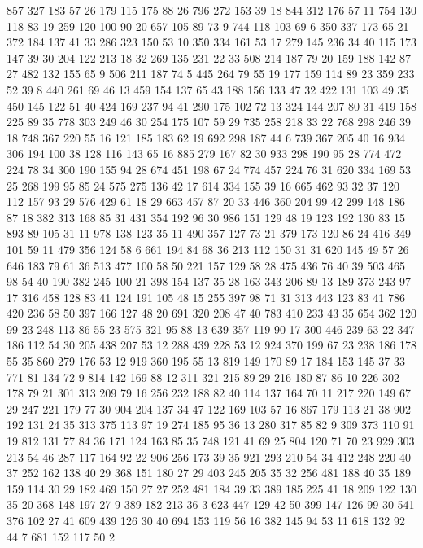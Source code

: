 \begin{pyverbatim}
{	857	327	183	57	26	179	115	175	88	26	796	272	153	39	18	844	312	176	57	11
	754	130	118	83	19	259	120	100	90	20	657	105	89	73	9	744	118	103	69	6
	350	337	173	65	21	372	184	137	41	33	286	323	150	53	10	350	334	161	53	17
	279	145	236	34	40	115	173	147	39	30	204	122	213	18	32	269	135	231	22	33
	508	214	187	79	20	159	188	142	87	27	482	132	155	65	9	506	211	187	74	5
	445	264	79	55	19	177	159	114	89	23	359	233	52	39	8	440	261	69	46	13
	459	154	137	65	43	188	156	133	47	32	422	131	103	49	35	450	145	122	51	40
	424	169	237	94	41	290	175	102	72	13	324	144	207	80	31	419	158	225	89	35
	778	303	249	46	30	254	175	107	59	29	735	258	218	33	22	768	298	246	39	18
	748	367	220	55	16	121	185	183	62	19	692	298	187	44	6	739	367	205	40	16
	934	306	194	100	38	128	116	143	65	16	885	279	167	82	30	933	298	190	95	28
	774	472	224	78	34	300	190	155	94	28	674	451	198	67	24	774	457	224	76	31
	620	334	169	53	25	268	199	95	85	24	575	275	136	42	17	614	334	155	39	16
	665	462	93	32	37	120	112	157	93	29	576	429	61	18	29	663	457	87	20	33
	446	360	204	99	42	299	148	186	87	18	382	313	168	85	31	431	354	192	96	30
	986	151	129	48	19	123	192	130	83	15	893	89	105	31	11	978	138	123	35	11
	490	357	127	73	21	379	173	120	86	24	416	349	101	59	11	479	356	124	58	6
	661	194	84	68	36	213	112	150	31	31	620	145	49	57	26	646	183	79	61	36
	513	477	100	58	50	221	157	129	58	28	475	436	76	40	39	503	465	98	54	40
	190	382	245	100	21	398	154	137	35	28	163	343	206	89	13	189	373	243	97	17
	316	458	128	83	41	124	191	105	48	15	255	397	98	71	31	313	443	123	83	41
	786	420	236	58	50	397	166	127	48	20	691	320	208	47	40	783	410	233	43	35
	654	362	120	99	23	248	113	86	55	23	575	321	95	88	13	639	357	119	90	17
	300	446	239	63	22	347	186	112	54	30	205	438	207	53	12	288	439	228	53	12
	924	370	199	67	23	238	186	178	55	35	860	279	176	53	12	919	360	195	55	13
	819	149	170	89	17	184	153	145	37	33	771	81	134	72	9	814	142	169	88	12
	311	321	215	89	29	216	180	87	86	10	226	302	178	79	21	301	313	209	79	16
	256	232	188	82	40	114	137	164	70	11	217	220	149	67	29	247	221	179	77	30
	904	204	137	34	47	122	169	103	57	16	867	179	113	21	38	902	192	131	24	35
	313	375	113	97	19	274	185	95	36	13	280	317	85	82	9	309	373	110	91	19
	812	131	77	84	36	171	124	163	85	35	748	121	41	69	25	804	120	71	70	23
	929	303	213	54	46	287	117	164	92	22	906	256	173	39	35	921	293	210	54	34
	412	248	220	40	37	252	162	138	40	29	368	151	180	27	29	403	245	205	35	32
	256	481	188	40	35	189	159	114	30	29	182	469	150	27	27	252	481	184	39	33
	389	185	225	41	18	209	122	130	35	20	368	148	197	27	9	389	182	213	36	3
	623	447	129	42	50	399	147	126	99	30	541	376	102	27	41	609	439	126	30	40
	694	153	119	56	16	382	145	94	53	11	618	132	92	44	7	681	152	117	50	2
}
\end{pyverbatim}
